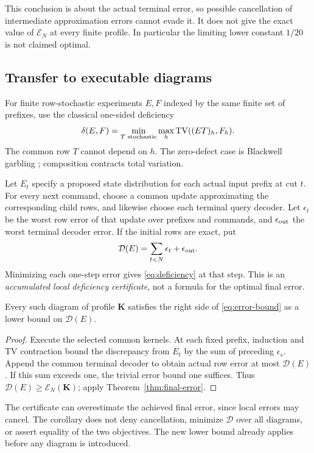 This conclusion is about the actual terminal error, so possible
cancellation of intermediate approximation errors cannot evade it.
It does not give the exact value of $\mathcal E_N$ at every finite profile.
In particular the limiting lower constant $1/20$ is not claimed optimal.

\subsection{Transfer to executable diagrams}
For finite row-stochastic experiments $E,F$ indexed by the same finite
set of prefixes, use the classical one-sided deficiency
\begin{equation}\label{eq:deficiency}
       \delta(E,F)=\min_{T\text{ stochastic}}\max_h
                                      \operatorname{TV}((ET)_h,F_h).
\end{equation}
The common row $T$ cannot depend on $h$. The zero-defect case is
Blackwell garbling \cite{Blackwell,Torgersen}; composition contracts total
variation.

Let $E_t$ specify a proposed state distribution for each actual input
prefix at cut $t$. For every next command, choose a common update
approximating the corresponding child rows, and likewise choose each
terminal query decoder. Let $\epsilon_t$ be the worst row error of that
update over prefixes and commands, and $\epsilon_{\rm out}$ the worst
terminal decoder error. If the initial rows are exact, put
\[
          \mathcal D(E)=\sum_{t<N}\epsilon_t+\epsilon_{\rm out}.
\]
Minimizing each one-step error gives \eqref{eq:deficiency} at that step.
This is an \emph{accumulated local deficiency certificate}, not a
formula for the optimal final error.

\begin{corollary}\label{cor:diagram}
Every such diagram of profile $\mathbf K$ satisfies the right side of
\eqref{eq:error-bound} as a lower bound on $\mathcal D(E)$.
\end{corollary}
\begin{proof}
Execute the selected common kernels. At each fixed prefix, induction and
TV contraction bound the discrepancy from $E_t$ by the sum of preceding
$\epsilon_s$. Append the common terminal decoder to obtain actual row
error at most $\mathcal D(E)$. If this sum exceeds one, the trivial error
bound one suffices. Thus $\mathcal D(E)\ge\mathcal E_N(\mathbf K)$;
apply Theorem~\ref{thm:final-error}.
\end{proof}
The certificate can overestimate the achieved final error, since local
errors may cancel. The corollary does not deny cancellation, minimize
$\mathcal D$ over all diagrams, or assert equality of the two objectives.
The new lower bound already applies before any diagram is introduced.
